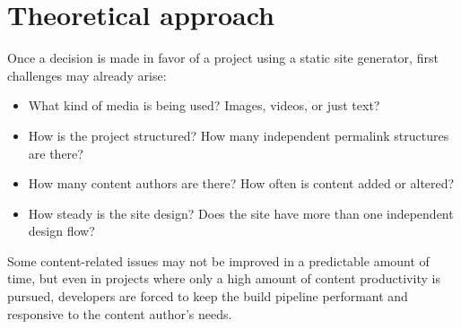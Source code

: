 \chapter{Theoretical approach}
\label{cha:theoreticalapproach}

Once a decision is made in favor of a project using a static site generator, first challenges may already arise:

\begin{itemize}
  \item What kind of media is being used? Images, videos, or just text?
  \item How is the project structured? How many independent permalink structures are there?
  \item How many content authors are there? How often is content added or altered?
  \item How steady is the site design? Does the site have more than one independent design flow?
\end{itemize}

Some content-related issues may not be improved in a predictable amount of time, but even in projects where only a high amount of content productivity is pursued, developers are forced to keep the build pipeline performant and responsive to the content author's needs.





